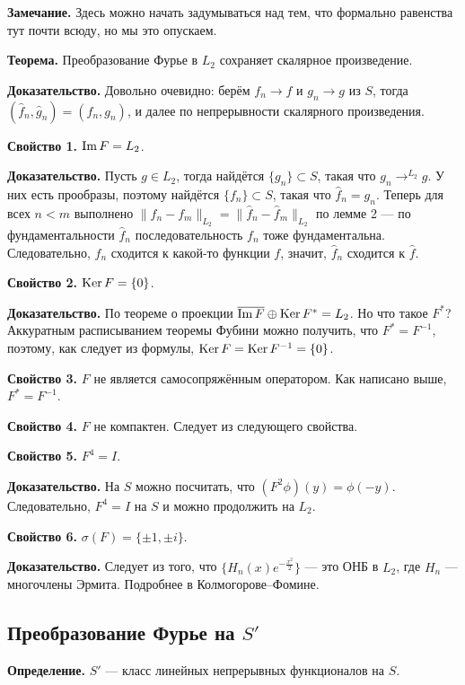 \QED

\textbf{Замечание.} Здесь можно начать задумываться над тем, что формально равенства тут почти всюду, но мы это опускаем.

\textbf{Теорема.} Преобразование Фурье в $L_2$ сохраняет скалярное произведение.

\textbf{Доказательство.} Довольно очевидно: берём $f_n \to f$ и $g_n \to g$ из $S$, тогда $(\hat f_n, \hat g_n) = (f_n, g_n)$, и далее по непрерывности скалярного произведения.

\QED

\textbf{Свойство 1.} $\operatorname{Im} F = L_2$.

\textbf{Доказательство.} Пусть $g \in L_2$, тогда найдётся $\{g_n\} \subset S$, такая что $g_n \to^{L_2} g$.
У них есть прообразы, поэтому найдётся $\{f_n\} \subset S$, такая что $\hat f_n = g_n$.
Теперь для всех $n < m$ выполнено $\|f_n - f_m\|_{L_2} = \|\hat f_n - \hat f_m\|_{L_2}$ по лемме 2 --- по фундаментальности $\hat f_n$ последовательность $f_n$ тоже фундаментальна.
Следовательно, $f_n$ сходится к какой-то функции $f$, значит, $\hat f_n$ сходится к $\hat f$.

\QED

\textbf{Свойство 2.} $\operatorname{Ker} F = \{0\}$.

\textbf{Доказательство.} По теореме о проекции $\overline{\operatorname{Im} F} \oplus \operatorname{Ker} F^* = L_2$.
Но что такое $F^*$?
Аккуратным расписыванием теоремы Фубини можно получить, что $F^* = F^{-1}$, поэтому, как следует из формулы, $\operatorname{Ker} F = \operatorname{Ker} F^{-1} = \{0\}$.

\QED

\textbf{Свойство 3.} $F$ не является самосопряжённым оператором.
Как написано выше, $F^* = F^{-1}$.

\textbf{Свойство 4.} $F$ не компактен.
Следует из следующего свойства.

\textbf{Свойство 5.} $F^4 = I$.

\textbf{Доказательство.} На $S$ можно посчитать, что $(F^2 \phi)(y) = \phi(-y)$.
Следовательно, $F^4 = I$ на $S$ и можно продолжить на $L_2$.

\QED

\textbf{Свойство 6.} $\sigma(F) = \{\pm 1, \pm i\}$.

\textbf{Доказательство.} Следует из того, что $\{H_n(x) e^{-\frac{x^2}{2}}\}$ --- это ОНБ в $L_2$, где $H_n$ --- многочлены Эрмита.
Подробнее в Колмогорове--Фомине.

\QED

\subsection{Преобразование Фурье на $S'$}
\textbf{Определение.} $S'$ --- класс линейных непрерывных функционалов на $S$.

